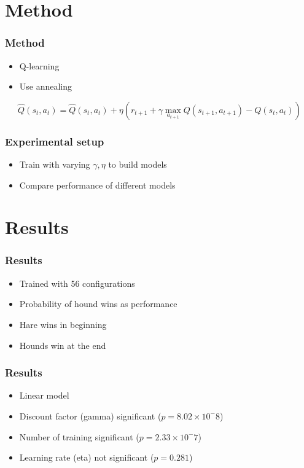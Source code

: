 \documentclass{beamer}
\begin{document}
\section{Method}
\begin{frame}
	\frametitle{Method}
	\begin{itemize}
		\item Q-learning
		\item Use annealing
	\end{itemize}
	\[ \hat{Q}(s_t, a_t) = \hat{Q}(s_t, a_t) + \eta \left(r_{t+1} + \gamma \max_{a_{t+1}} Q(s_{t+1}, a_{t+1}) - Q(s_t, a_t)\right) \]
\end{frame}

\begin{frame}
	\frametitle{Experimental setup}
	\begin{itemize}
		\item Train with varying $\gamma, \eta$ to build models
		\item Compare performance of different models
	\end{itemize}
\end{frame}

\section{Results}
\begin{frame}
    \frametitle{Results}
    \begin{itemize}
        \item Trained with 56 configurations
        \item Probability of hound wins as performance

            \phantom{M}

        \item Hare wins in beginning
        \item Hounds win at the end
    \end{itemize}
\end{frame}

\begin{frame}
    \frametitle{Results}
    \begin{itemize}
        \item Linear model
        \item Discount factor (gamma) significant ($p = 8.02 \times 10^-8$)
        \item Number of training significant ($p = 2.33 \times 10^-7$)
        \item Learning rate (eta) not significant ($p = 0.281$)
    \end{itemize}
\end{frame}
\end{document}
